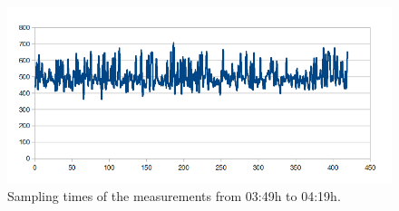 \begin{figure}[tbp]
	\centering
	\includegraphics[scale=0.5]{content/images/Experiment/NightRounds}
 	\caption{Sampling times of the measurements from 03:49h to 04:19h.}
	\label{fig:nightR}
\end{figure}

